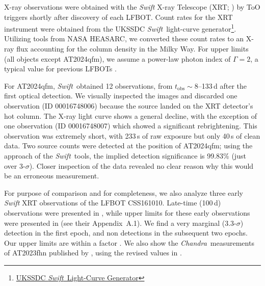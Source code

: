 \documentclass[twocolumn,twocolappendix, linenumbers, trackchanges]{aastex7}
\newcommand{\swift}{\emph{Swift}}
\newcommand{\chandra}{\emph{Chandra}}
\begin{document}
X-ray observations were obtained with the \emph{Swift} X-ray Telescope (XRT; \citealt{swift_xrt})  by 
ToO triggers shortly after discovery of each LFBOT.  Count rates for the XRT instrument were obtained from the UKSSDC \swift\ light-curve generator\footnote{\href{https://www.swift.ac.uk/user_objects/lc_docs.php}{UKSSDC \swift\ Light-Curve Generator}}.  Utilizing tools from NASA HEASARC, we converted these count rates to an X-ray flux accounting for the  column density in the Milky Way. For upper limits (all objects except AT2024qfm), we assume a power-law photon index of $\Gamma=2$, a typical value for previous LFBOTs \citep{sandoval2018, margutti, bright2022,matthews2023}. %

For AT2024qfm, \swift\ obtained 12 observations, from $t_{\text{obs}}\sim8$--133\,d after the first optical detection. We visually inspected the images and discarded one observation (ID 00016748006) because the source landed on the XRT detector's hot column.  The X-ray light curve shows a general decline, with the exception of one observation 
(ID 00016748007) which showed a significant rebrightening. This observation was extremely short, with 233\,s of raw exposure but only 40\,s of clean data. Two source counts were detected at the position of AT2024qfm; using the \citet{Kraft1991} approach of the \swift\ tools, the implied detection significance is 99.83\% (just over 3-$\sigma$). Closer inspection of the data revealed no clear reason why this would be an erroneous measurement.%

For purpose of comparison and for completeness, we also analyze three early \emph{Swift} XRT observations of the LFBOT CSS161010. Late-time (100\,d) observations were presented in \citet{coppejans2020}, while upper limits for these early observations were presented in \citet{Gutierrez2024} (see their Appendix~A.1). We find a very marginal (3.3-$\sigma$) detection in the first epoch, and non detections in the subsequent two epochs. Our upper limits are within a factor .  We also show the  \chandra\ measurements of AT2023fhn published by \citet{chrimesfhn}, using the revised values in \citet{nayana2025}.
\end{document}
